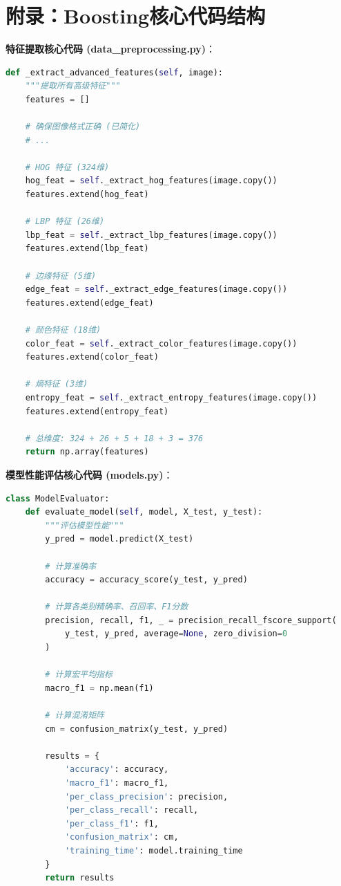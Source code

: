 \documentclass[UTF8]{report}
\theoremstyle{MyLineTheoremStyle} %
\theoremstyle{MyBlockTheoremStyle} %
\theoremstyle{MySubsubsectionStyle} %
\begin{document}
\section*{附录：Boosting核心代码结构}
\textbf{特征提取核心代码 (data\_preprocessing.py)}：
\begin{lstlisting}[language=Python, caption={简化的多维特征提取与拼接过程}]
def _extract_advanced_features(self, image):
    """提取所有高级特征"""
    features = []
    
    # 确保图像格式正确 (已简化)
    # ...
    
    # HOG 特征 (324维)
    hog_feat = self._extract_hog_features(image.copy())
    features.extend(hog_feat)
    
    # LBP 特征 (26维)
    lbp_feat = self._extract_lbp_features(image.copy())
    features.extend(lbp_feat)
    
    # 边缘特征 (5维)
    edge_feat = self._extract_edge_features(image.copy())
    features.extend(edge_feat)
    
    # 颜色特征 (18维)
    color_feat = self._extract_color_features(image.copy())
    features.extend(color_feat)
    
    # 熵特征 (3维)
    entropy_feat = self._extract_entropy_features(image.copy())
    features.extend(entropy_feat)
    
    # 总维度: 324 + 26 + 5 + 18 + 3 = 376
    return np.array(features)
\end{lstlisting}

\textbf{模型性能评估核心代码 (models.py)}：
\begin{lstlisting}[language=Python, caption={模型评估与关键指标计算}]
class ModelEvaluator:
    def evaluate_model(self, model, X_test, y_test):
        """评估模型性能"""
        y_pred = model.predict(X_test)
        
        # 计算准确率
        accuracy = accuracy_score(y_test, y_pred)
        
        # 计算各类别精确率、召回率、F1分数
        precision, recall, f1, _ = precision_recall_fscore_support(
            y_test, y_pred, average=None, zero_division=0
        )
        
        # 计算宏平均指标
        macro_f1 = np.mean(f1)
        
        # 计算混淆矩阵
        cm = confusion_matrix(y_test, y_pred)
        
        results = {
            'accuracy': accuracy,
            'macro_f1': macro_f1,
            'per_class_precision': precision,
            'per_class_recall': recall,
            'per_class_f1': f1,
            'confusion_matrix': cm,
            'training_time': model.training_time
        }
        return results
\end{lstlisting}
\end{document}
